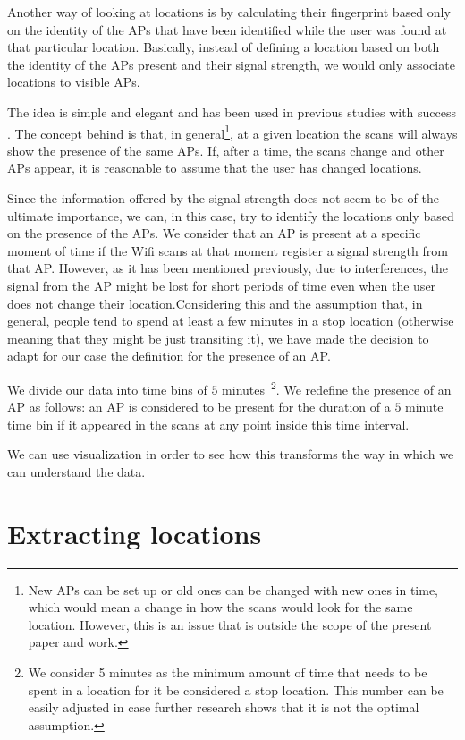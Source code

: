 Another way of looking at locations is by calculating their fingerprint based
only on the identity of the APs that have been identified while the user was
found at that particular location. Basically, instead of defining a location
based on both the identity of the APs present and their signal strength, we
would only associate locations to visible APs.

The idea is simple and elegant and has been used in previous studies with
success \cite{Larsen:2009:MCT:1813042.1813063}. The concept behind is that, in
general\footnote{New APs can be set up or old ones can be changed with new ones
in time, which would mean a change in how the scans would look for the same
location. However, this is an issue that is outside the scope of the present
paper and work.}, at a given location the scans will always show the presence of
the same APs. If, after a time, the scans change and other APs appear, it is
reasonable to assume that the user has changed locations.

Since the information offered by the signal strength does not seem to be of the
ultimate importance, we can, in this case, try to identify the locations only
based on the presence of the APs. We consider that an AP is present at a
specific moment of time if the Wifi scans at that moment register a signal
strength from that AP. However, as it has been mentioned previously, due to
interferences, the signal from the AP might be lost for short periods of time
even when the user does not change their location.Considering this and the
assumption that, in general, people tend to spend at least a few minutes in a
stop location (otherwise meaning that they might be just transiting it), we have
made the decision to adapt for our case the definition for the presence of an
AP.

We divide our data into time bins of $5$ minutes~\footnote{We consider 5 minutes
as the minimum amount of time that needs to be spent in a location for it be
considered a stop location. This number can be easily adjusted in case further
research shows that it is not the optimal assumption.}. We redefine the presence
of an AP as follows: an AP is considered to be present for the duration of a $5$
minute time bin if it appeared in the scans at any point inside this time
interval.

We can use visualization in order to see how this transforms the way in which we
can understand the data.

\section{Extracting locations}
